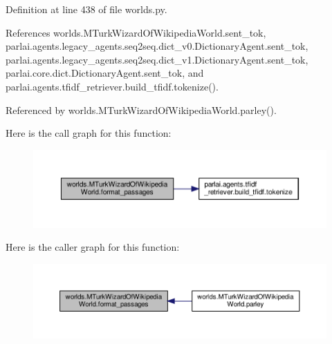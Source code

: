 Definition at line 438 of file worlds.\+py.



References worlds.\+M\+Turk\+Wizard\+Of\+Wikipedia\+World.\+sent\+\_\+tok, parlai.\+agents.\+legacy\+\_\+agents.\+seq2seq.\+dict\+\_\+v0.\+Dictionary\+Agent.\+sent\+\_\+tok, parlai.\+agents.\+legacy\+\_\+agents.\+seq2seq.\+dict\+\_\+v1.\+Dictionary\+Agent.\+sent\+\_\+tok, parlai.\+core.\+dict.\+Dictionary\+Agent.\+sent\+\_\+tok, and parlai.\+agents.\+tfidf\+\_\+retriever.\+build\+\_\+tfidf.\+tokenize().



Referenced by worlds.\+M\+Turk\+Wizard\+Of\+Wikipedia\+World.\+parley().

Here is the call graph for this function\+:
\nopagebreak
\begin{figure}[H]
\begin{center}
\leavevmode
\includegraphics[width=350pt]{classworlds_1_1MTurkWizardOfWikipediaWorld_a2b08068e94df414f15e2173d5e8bd20b_cgraph}
\end{center}
\end{figure}
Here is the caller graph for this function\+:
\nopagebreak
\begin{figure}[H]
\begin{center}
\leavevmode
\includegraphics[width=350pt]{classworlds_1_1MTurkWizardOfWikipediaWorld_a2b08068e94df414f15e2173d5e8bd20b_icgraph}
\end{center}
\end{figure}
\mbox{\label{classworlds_1_1MTurkWizardOfWikipediaWorld_a99b976d4f864256d99873f88933632c0}} 
